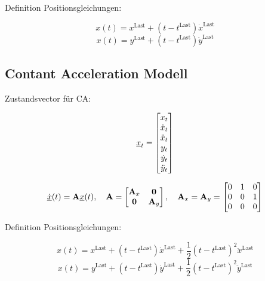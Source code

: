 Definition Positionsgleichungen:

\begin{equation*}
    x(t) = x^{\text{Last}} + (t - t^{\text{Last}})\dot{x}^{\text{Last}}
\end{equation*}
\begin{equation*}
    x(t) = y^{\text{Last}} + (t - t^{\text{Last}})\dot{y}^{\text{Last}}
\end{equation*}



\subsection{Contant Acceleration Modell}

Zustandsvector für CA:

\begin{equation*} \label{eq:definitionCA}
    {\underline{x}}_t = 
    \begin{bmatrix}
        x_t \\
        \dot{x}_t \\
        \ddot{x}_t \\
        y_t \\
        \dot{y}_t \\
        \ddot{y}_t
       \end{bmatrix} 
\end{equation*}


\begin{align*} \label{eq:speedCV}
    \dot{{\underline{x}}}(t) = {{\mathbf{A}}}{\underline{x}}(t), \quad {\ensuremath{{\mathbf{A}}}} = 
    \begin{bmatrix}
        {\ensuremath{{\mathbf{A}}}}_x & \boldsymbol{0} \\
        \boldsymbol{0} & {{\mathbf{A}}}_y
    \end{bmatrix} 
    , \quad
    {\ensuremath{{\mathbf{A}}}}_x = {{\mathbf{A}}}_y = 
    \begin{bmatrix}
        0 & 1 & 0 \\
        0 & 0 & 1 \\
        0 & 0 & 0
    \end{bmatrix} 
\end{align*}

Definition Positionsgleichungen:

\begin{equation*}
    x(t) = x^{\text{Last}} + (t - t^{\text{Last}})\dot{x}^{\text{Last}} 
    + \frac{1}{2} (t - t^{\text{Last}})^2 \ddot{x}^{\text{Last}}
\end{equation*}
\begin{equation*}
    x(t) = y^{\text{Last}} + (t - t^{\text{Last}})\dot{y}^{\text{Last}}
    + \frac{1}{2} (t - t^{\text{Last}})^2 \ddot{y}^{\text{Last}}
\end{equation*}

